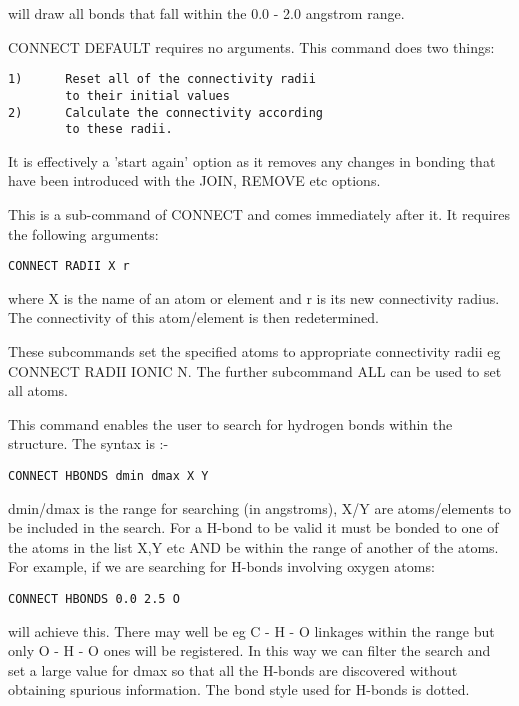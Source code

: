 \documentclass[10pt,a4paper]{report}
\begin{document}
will draw all bonds that fall within the 0.0 - 2.0 angstrom range.


\bigskip{}
CONNECT DEFAULT requires no arguments. This command does two
things:
\small\begin{verbatim}
1)      Reset all of the connectivity radii
        to their initial values
2)      Calculate the connectivity according
        to these radii.
\end{verbatim}\normalsize


It is effectively a 'start again' option as it removes any
changes in
bonding that have been introduced with the JOIN, REMOVE etc
options.


\bigskip{}
This is a sub-command of CONNECT and comes immediately after it.
It requires the following arguments:
\small\begin{verbatim}
CONNECT RADII X r
\end{verbatim}\normalsize


where X is the name of an atom or element and r is its new
connectivity
radius. The connectivity of this atom/element is then
redetermined.


\bigskip{}


\bigskip{}


\bigskip{}
These subcommands set the specified atoms to appropriate connectivity 
radii eg CONNECT RADII IONIC N. The further subcommand ALL can be used 
to set all atoms.


\bigskip{}
This command enables the user to search for hydrogen bonds within
the
structure. The syntax is :-
\small\begin{verbatim}
CONNECT HBONDS dmin dmax X Y
\end{verbatim}\normalsize


dmin/dmax is the range for searching (in angstroms), X/Y are atoms/elements to
be
included in the search. For a H-bond to be valid it must be
bonded to
one of the atoms in the list X,Y etc AND be within the range of
another
of the atoms. For example, if we are searching for H-bonds
involving oxygen atoms:
\small\begin{verbatim}
CONNECT HBONDS 0.0 2.5 O
\end{verbatim}\normalsize


will achieve this. There may well be eg C - H - O linkages within
the range
but only O - H - O ones will be registered. In this way we can
filter
the search and set a large value for dmax so that all the H-bonds
are
discovered without obtaining spurious information. The bond style
used
for H-bonds is dotted.
\end{document}
